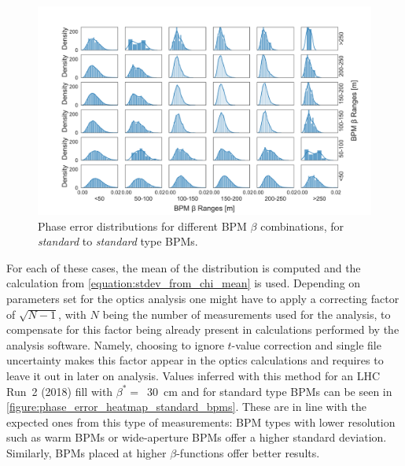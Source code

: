 \begin{figure}[!htb]
    \centering
    \includegraphics*[width=\textwidth]{Figures/Other_Studies/phase_grid_distributions_errors_standard_standard.pdf}
    \caption{Phase error distributions for different BPM \(\beta\) combinations, for \textit{standard} to \textit{standard} type BPMs. }
    \label{figure:grid_distributions_standard_standard}
\end{figure}

For each of these cases, the mean of the distribution is computed and the calculation from \cref{equation:stdev_from_chi_mean} is used.
Depending on parameters set for the optics analysis one might have to apply a correcting factor of \(\sqrt{N-1}\), with \(N\) being the number of measurements used for the analysis, to compensate for this factor being already present in calculations performed by the analysis software.
Namely, choosing to ignore \(t\)-value correction and single file uncertainty makes this factor appear in the optics calculations and requires to leave it out in later on analysis.
Values inferred with this method for an LHC Run~\num{2} (\num{2018}) fill with \(\beta^{\ast} =\)~\qty{30}{\centi\meter} and for standard type BPMs can be seen in \cref{figure:phase_error_heatmap_standard_bpms}.
These are in line with the expected ones from this type of measurements: BPM types with lower resolution such as warm BPMs or wide-aperture BPMs offer a higher standard deviation.
Similarly, BPMs placed at higher \(\beta\)-functions offer better results.

